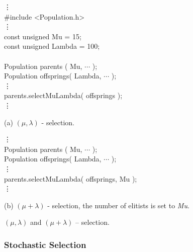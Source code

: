 \begin{example}[htb]
\begin{shortlisting}
            \vdots\\
\#include <Population.h>\\
            \vdots\\
const unsigned Mu     = 15;\\
const unsigned Lambda = 100;\\
\\
Population parents   ( Mu,     $\cdots$ );\\
Population offsprings( Lambda, $\cdots$ );\\
            \vdots\\
parents.selectMuLambda( offsprings );\\
            \vdots\\
\end{shortlisting}

(a) $(\mu,\lambda)$ - selection.

\begin{shortlisting}
            \vdots\\
Population parents   ( Mu,     $\cdots$ );\\
Population offsprings( Lambda, $\cdots$ );\\
            \vdots\\
parents.selectMuLambda( offsprings, Mu );\\
            \vdots\\
\end{shortlisting}

(b) $(\mu+\lambda)$ - selection, the number of elitists is set to {\em Mu}.

\caption[$(\mu,\lambda)$ and $(\mu+\lambda)$ -- Selection]{
    \label{selection:example:mu-lambda}
    $(\mu,\lambda)$ and $(\mu+\lambda)$ -- selection.
}
\end{example}


        \subsubsection{Stochastic Selection}

